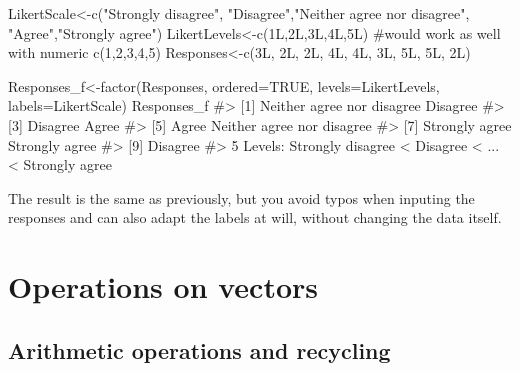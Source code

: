 \documentclass[
  letterpaper,
  DIV=11,
  numbers=noendperiod]{scrreprt}
\newenvironment{Shaded}{\begin{snugshade}}{\end{snugshade}}
\newcommand{\AttributeTok}[1]{\textcolor[rgb]{0.40,0.45,0.13}{#1}}
\newcommand{\CommentTok}[1]{\textcolor[rgb]{0.37,0.37,0.37}{#1}}
\newcommand{\ConstantTok}[1]{\textcolor[rgb]{0.56,0.35,0.01}{#1}}
\newcommand{\DecValTok}[1]{\textcolor[rgb]{0.68,0.00,0.00}{#1}}
\newcommand{\FunctionTok}[1]{\textcolor[rgb]{0.28,0.35,0.67}{#1}}
\newcommand{\NormalTok}[1]{\textcolor[rgb]{0.00,0.23,0.31}{#1}}
\newcommand{\OtherTok}[1]{\textcolor[rgb]{0.00,0.23,0.31}{#1}}
\newcommand{\StringTok}[1]{\textcolor[rgb]{0.13,0.47,0.30}{#1}}
\begin{document}
\begin{Shaded}
\begin{Highlighting}[]
\NormalTok{LikertScale}\OtherTok{\textless{}{-}}\FunctionTok{c}\NormalTok{(}\StringTok{"Strongly disagree"}\NormalTok{, }\StringTok{"Disagree"}\NormalTok{,}\StringTok{"Neither agree nor disagree"}\NormalTok{,}
\StringTok{"Agree"}\NormalTok{,}\StringTok{"Strongly agree"}\NormalTok{) }
\NormalTok{LikertLevels}\OtherTok{\textless{}{-}}\FunctionTok{c}\NormalTok{(}\DecValTok{1}\NormalTok{L,}\DecValTok{2}\NormalTok{L,}\DecValTok{3}\NormalTok{L,}\DecValTok{4}\NormalTok{L,}\DecValTok{5}\NormalTok{L) }\CommentTok{\#would work as well with numeric c(1,2,3,4,5)}
\NormalTok{Responses}\OtherTok{\textless{}{-}}\FunctionTok{c}\NormalTok{(}\DecValTok{3}\NormalTok{L, }\DecValTok{2}\NormalTok{L, }\DecValTok{2}\NormalTok{L, }\DecValTok{4}\NormalTok{L, }\DecValTok{4}\NormalTok{L, }\DecValTok{3}\NormalTok{L, }\DecValTok{5}\NormalTok{L, }\DecValTok{5}\NormalTok{L, }\DecValTok{2}\NormalTok{L)}

\NormalTok{Responses\_f}\OtherTok{\textless{}{-}}\FunctionTok{factor}\NormalTok{(Responses, }\AttributeTok{ordered=}\ConstantTok{TRUE}\NormalTok{, }\AttributeTok{levels=}\NormalTok{LikertLevels, }\AttributeTok{labels=}\NormalTok{LikertScale)}
\NormalTok{Responses\_f}
\CommentTok{\#\textgreater{} [1] Neither agree nor disagree Disagree                  }
\CommentTok{\#\textgreater{} [3] Disagree                   Agree                     }
\CommentTok{\#\textgreater{} [5] Agree                      Neither agree nor disagree}
\CommentTok{\#\textgreater{} [7] Strongly agree             Strongly agree            }
\CommentTok{\#\textgreater{} [9] Disagree                  }
\CommentTok{\#\textgreater{} 5 Levels: Strongly disagree \textless{} Disagree \textless{} ... \textless{} Strongly agree}
\end{Highlighting}
\end{Shaded}

The result is the same as previously, but you avoid typos when inputing
the responses and can also adapt the labels at will, without changing
the data itself.

\section{Operations on vectors}\label{operations-on-vectors}

\subsection{Arithmetic operations and
recycling}\label{arithmetic-operations-and-recycling}
\end{document}
